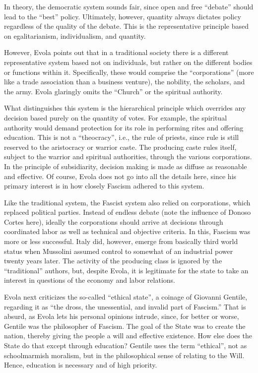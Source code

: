 In theory, the democratic system sounds fair, since open and free “debate” should lead to the “best” policy. Ultimately, however, quantity always dictates policy regardless of the quality of the debate. This is the representative principle based on egalitarianism, individualism, and quantity.

However, Evola points out that in a traditional society there is a different representative system based not on individuals, but rather on the different bodies or functions within it. Specifically, these would comprise the “corporations” (more like a trade association than a business venture), the nobility, the scholars, and the army. Evola glaringly omits the “Church” or the spiritual authority.

What distinguishes this system is the hierarchical principle which overrides any decision based purely on the quantity of votes. For example, the spiritual authority would demand protection for its role in performing rites and offering education. This is not a “theocracy”, i.e., the rule of priests, since rule is still reserved to the aristocracy or warrior caste. The producing caste rules itself, subject to the warrior and spiritual authorities, through the various corporations. In the principle of subsidiarity, decision making is made as diffuse as reasonable and effective. Of course, Evola does not go into all the details here, since his primary interest is in how closely Fascism adhered to this system.

Like the traditional system, the Fascist system also relied on corporations, which replaced political parties. Instead of endless debate (note the influence of Donoso Cortes here), ideally the corporations should arrive at decisions through coordinated labor as well as technical and objective criteria. In this, Fascism was more or less successful. Italy did, however, emerge from basically third world status when Mussolini assumed control to somewhat of an industrial power twenty years later. The activity of the producing class is ignored by the “traditional” authors, but, despite Evola, it is legitimate for the state to take an interest in questions of the economy and labor relations.

Evola next criticizes the so-called “ethical state”, a coinage of Giovanni Gentile, regarding it as “the dross, the unessential, and invalid part of Fascism.” That is absurd, as Evola lets his personal opinions intrude, since, for better or worse, Gentile was the philosopher of Fascism. The goal of the State was to create the nation, thereby giving the people a will and effective existence. How else does the State do that except through education? Gentile uses the term “ethical”, not as schoolmarmish moralism, but in the philosophical sense of relating to the Will. Hence, education is necessary and of high priority.

